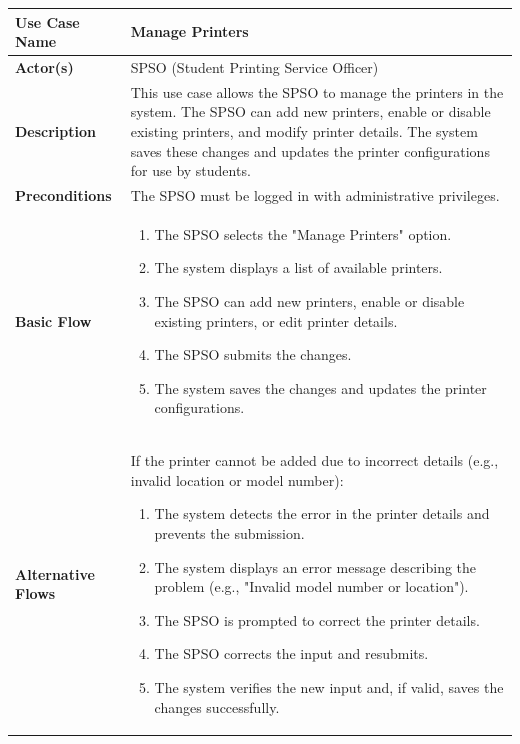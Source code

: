 \documentclass[a4paper]{report}
\begin{document}
\begin{enumerate}
        \begin{table}[h!]
            \centering
            \renewcommand{\arraystretch}{1.8}
            \begin{tabular}{|>{\centering\arraybackslash}m{3cm}|>{\raggedright\arraybackslash}m{10cm}|}
            \hline
            \textbf{Use Case Name} & Manage Printers \\ \hline
            \textbf{Actor(s)} & SPSO (Student Printing Service Officer) \\ \hline
            \textbf{Description} & This use case allows the SPSO to manage the printers in the system. The SPSO can add new printers, enable or disable existing printers, and modify printer details. The system saves these changes and updates the printer configurations for use by students. \\ \hline
            \textbf{Preconditions} & The SPSO must be logged in with administrative privileges. \\ \hline
            \textbf{Basic Flow} & 
            \begin{enumerate}
                \item The SPSO selects the "Manage Printers" option.
                \item The system displays a list of available printers.
                \item The SPSO can add new printers, enable or disable existing printers, or edit printer details.
                \item The SPSO submits the changes.
                \item The system saves the changes and updates the printer configurations.
            \end{enumerate} \\ \hline
            \textbf{Alternative Flows} & 
            If the printer cannot be added due to incorrect details (e.g., invalid location or model number):
            \begin{enumerate}
                \item The system detects the error in the printer details and prevents the submission.
                \item The system displays an error message describing the problem (e.g., "Invalid model number or location").
                \item The SPSO is prompted to correct the printer details.
                \item The SPSO corrects the input and resubmits.
                \item The system verifies the new input and, if valid, saves the changes successfully.

\end{enumerate}
\end{tabular}
\end{table}
\end{enumerate}
\end{document}

